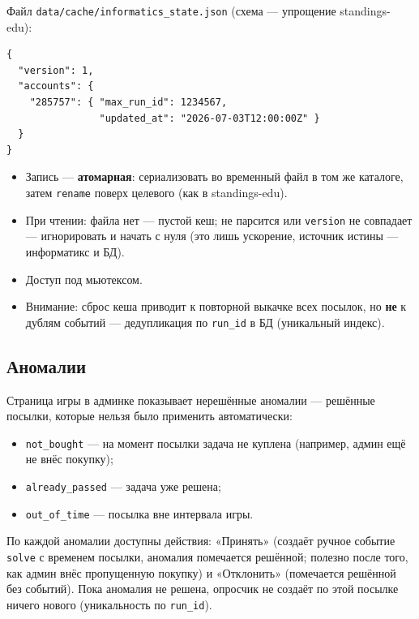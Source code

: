 \documentclass[12pt,a4paper]{article}
\newcommand{\field}[1]{\texttt{#1}}
\newcommand{\btn}[1]{«#1»}
\begin{document}
Файл \field{data/cache/informatics\_state.json} (схема --- упрощение
standings-edu):

\begin{small}\begin{verbatim}
{
  "version": 1,
  "accounts": {
    "285757": { "max_run_id": 1234567,
                "updated_at": "2026-07-03T12:00:00Z" }
  }
}
\end{verbatim}\end{small}

\begin{itemize}[nosep]
  \item Запись --- \textbf{атомарная}: сериализовать во временный файл в том
        же каталоге, затем \field{rename} поверх целевого (как в
        standings-edu).
  \item При чтении: файла нет --- пустой кеш; не парсится или
        \field{version} не совпадает --- игнорировать и начать с нуля
        (это лишь ускорение, источник истины --- информатикс и БД).
  \item Доступ под мьютексом.
  \item Внимание: сброс кеша приводит к повторной выкачке всех посылок, но
        \textbf{не} к дублям событий --- дедупликация по \field{run\_id}
        в БД (уникальный индекс).
\end{itemize}

\subsection{Аномалии}
\label{sec:autoevents}

Страница игры в админке показывает нерешённые аномалии --- решённые посылки,
которые нельзя было применить автоматически:

\begin{itemize}[nosep]
  \item \field{not\_bought} --- на момент посылки задача не куплена
        (например, админ ещё не внёс покупку);
  \item \field{already\_passed} --- задача уже решена;
  \item \field{out\_of\_time} --- посылка вне интервала игры.
\end{itemize}

По каждой аномалии доступны действия: \btn{Принять} (создаёт ручное событие
\field{solve} с временем посылки, аномалия помечается решённой; полезно
после того, как админ внёс пропущенную покупку) и \btn{Отклонить}
(помечается решённой без событий). Пока аномалия не решена, опросчик не
создаёт по этой посылке ничего нового (уникальность по \field{run\_id}).
\end{document}
